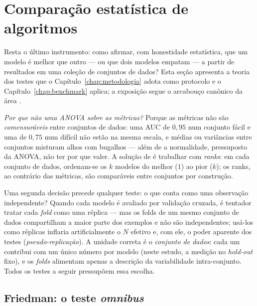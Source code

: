 \section{Comparação estatística de algoritmos}
\label{sec:fund-estatistica}

Resta o último instrumento: como afirmar, com honestidade estatística, que
um modelo é melhor que outro --- ou que dois modelos empatam --- a partir
de resultados em uma coleção de conjuntos de dados? Esta seção apresenta a
teoria dos testes que o Capítulo~\ref{chap:metodologia} adota como protocolo e o Capítulo~\ref{chap:benchmark}
aplica; a exposição segue o arcabouço canônico da área
\citep{demsar2006,benavoli2017}.

\emph{Por que não uma ANOVA sobre as métricas?} Porque as métricas não
são \emph{comensuráveis} entre conjuntos de dados: uma AUC de $0{,}95$ num
conjunto fácil e uma de $0{,}75$ num difícil não estão na mesma escala, e
médias ou variâncias entre conjuntos misturam alhos com bugalhos --- além
de a normalidade, pressuposto da ANOVA, não ter por que valer. A solução de
\citet{demsar2006} é trabalhar com \emph{ranks}: em cada conjunto de dados,
ordenam-se os $k$ modelos do melhor ($1$) ao pior ($k$); os ranks, ao
contrário das métricas, são comparáveis entre conjuntos por construção.

Uma segunda decisão precede
qualquer teste: o que conta como uma observação independente? Quando cada
modelo é avaliado por validação cruzada, é tentador tratar cada
\emph{fold} como uma réplica --- mas os folds de um mesmo conjunto de
dados compartilham a maior parte dos exemplos e não são independentes;
usá-los como réplicas inflaria artificialmente o $N$ efetivo e, com ele, o
poder aparente dos testes (\emph{pseudo-replicação}). A unidade correta é
o \emph{conjunto de dados}: cada um contribui com um único número por
modelo (neste estudo, a medição no \emph{hold-out} fixo), e os
\emph{folds} alimentam apenas a descrição da
variabilidade intra-conjunto. Todos os testes a seguir pressupõem essa
escolha.

\subsection{Friedman: o teste \emph{omnibus}}

